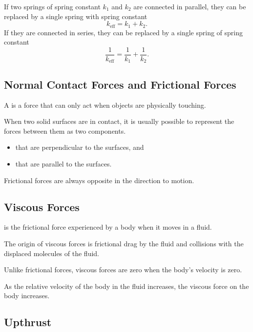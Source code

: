 If two springs of spring constant $k_1$ and $k_2$ are connected in parallel, they can be replaced by a single spring with spring constant \[k_{\text{eff}} = k_1 + k_2.\] If they are connected in series, they can be replaced by a single spring of spring constant \[\frac1{k_{\text{eff}}} = \frac1{k_1} + \frac1{k_2}.\]

\subsection{Normal Contact Forces and Frictional Forces}

\begin{definition}
    A  is a force that can only act when objects are physically touching.
\end{definition}

When two solid surfaces are in contact, it is usually possible to represent the forces between them as two components.
\begin{itemize}
    \item {} that are perpendicular to the surfaces, and
    \item {} that are parallel to the surfaces.
\end{itemize}

Frictional forces are always opposite in the direction to motion.

\subsection{Viscous Forces}

\begin{definition}
     is the frictional force experienced by a body when it moves in a fluid. 
\end{definition}

The origin of viscous forces is frictional drag by the fluid and collisions with the displaced molecules of the fluid.

Unlike frictional forces, viscous forces are zero when the body's velocity is zero.

As the relative velocity of the body in the fluid increases, the viscous force on the body increases.

\subsection{Upthrust}

